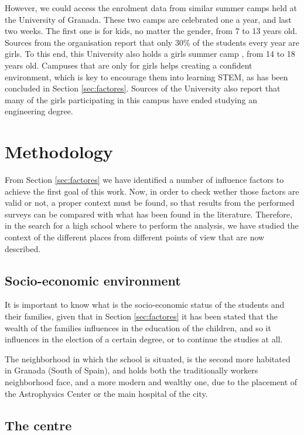 \documentclass[journal,transmag]{IEEEtran}
\begin{document}
However, we could access the enrolment data from similar summer camps held at the University of Granada. These two camps are celebrated one a year, and last two weeks. The first one \cite{cinfant:site} is for kids, no matter the gender, from 7 to 13 years old. Sources from the organisation report that only 30\% of the students every year are girls. To this end, this University also holds a girls summer camp \cite{cchicas:site}, from 14 to 18 years old. Campuses that are only for girls helps creating a confident environment, which is key to encourage them into learning STEM, as has been concluded in Section \ref{sec:factores}. Sources of the University also report that many of the girls participating in this campus have ended studying an engineering degree.

\section{Methodology}
\label{sec:metodologia}

From Section \ref{sec:factores} we have identified a number of influence factors to achieve the first goal of this work. Now, in order to check wether those factors are valid or not, a proper context must be found, so that results from the performed surveys can be compared with what has been found in the literature. Therefore, in the search for a high school where to perform the analysis, we have studied the context of the different places from different points of view that are now described.

\subsection{Socio-economic environment}

It is important to know what is the socio-economic status of the students and their families, given that in Section \ref{sec:factores} it has been stated that the wealth of the families influences in the education of the children, and so it influences in the election of a certain degree, or to continue the studies at all.

The neighborhood in which the school is situated, is the second more habitated in Granada (South of Spain), and holds both the traditionally workers neighborhood face, and a more modern and wealthy one, due to the placement of the Astrophysics Center or the main hospital of the city.

\subsection{The centre}
\end{document}
